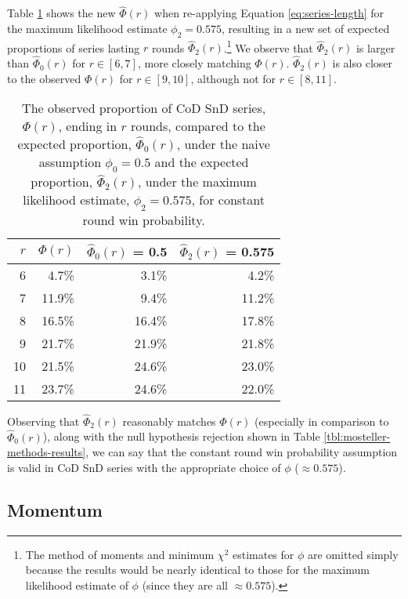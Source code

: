 \documentclass{article}
\begin{document}
Table \ref{tbl:expected-series-lengths-alternative-ps} shows the new
\(\hat{\Phi}(r)\) when re-applying Equation \ref{eq:series-length} for
the maximum likelihood estimate \(\phi_2 = 0.575\), resulting in a new
set of expected proportions of series lasting \(r\) rounds
\(\hat{\Phi}_2(r)\).\footnote{The method of moments and minimum
  \(\chi^2\) estimates for \(\phi\) are omitted simply because the
  results would be nearly identical to those for the maximum likelihood
  estimate of \(\phi\) (since they are all \(\approx 0.575\)).} We
observe that \(\hat{\Phi}_2(r)\) is larger than \(\hat{\Phi}_0(r)\) for
\(r \in [6, 7]\), more closely matching \(\Phi(r)\). \(\hat{\Phi}_2(r)\)
is also closer to the observed \(\Phi(r)\) for \(r \in [9, 10]\),
although not for \(r \in [8, 11]\).

\begin{longtable}{rrrr}
\caption{The observed proportion of CoD SnD series, $\Phi(r)$, ending in $r$ rounds, compared to the expected proportion, $\hat{\Phi}_0(r)$, under the naive assumption $\phi_0 = 0.5$ and the expected proportion, $\hat{\Phi}_2(r)$, under the maximum likelihood estimate, $\phi_2 = 0.575$, for constant round win probability.}\label{tbl:expected-series-lengths-alternative-ps} \\
\toprule()
$r$ & $\Phi(r)$ & $\hat{\Phi}_0(r)$ = 0.5 & $\hat{\Phi}_2(r)$ = 0.575 \\
\midrule()
\endhead
6 & 4.7\% & 3.1\% & 4.2\% \\
7 & 11.9\% & 9.4\% & 11.2\% \\
8 & 16.5\% & 16.4\% & 17.8\% \\
9 & 21.7\% & 21.9\% & 21.8\% \\
10 & 21.5\% & 24.6\% & 23.0\% \\
11 & 23.7\% & 24.6\% & 22.0\% \\
\bottomrule()
\end{longtable}

Observing that \(\hat{\Phi}_2(r)\) reasonably matches \(\Phi(r)\)
(especially in comparison to \(\hat{\Phi}_0(r)\)), along with the null
hypothesis rejection shown in Table \ref{tbl:mosteller-methods-results},
we can say that the constant round win probability assumption is valid
in CoD SnD series with the appropriate choice of \(\phi\)
(\(\approx 0.575\)).

\hypertarget{momentum-1}{%
\subsection{Momentum}\label{momentum-1}}
\end{document}
